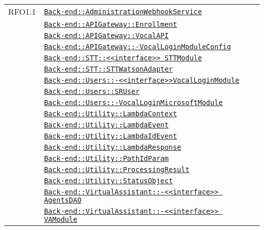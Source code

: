 \begin{longtable}{|>{\centering}m{3cm}|m{10cm}<{\centering}|}
RFO1.1 & \hyperref[Back-end::AdministrationWebhookService]{\texttt{Back-end::AdministrationWebhookService}}\\
& \hyperref[Back-end::APIGateway::Enrollment]{\texttt{Back-end::APIGateway::Enrollment}}\\
& \hyperref[Back-end::APIGateway::VocalAPI]{\texttt{Back-end::APIGateway::VocalAPI}}\\
& \hyperref[Back-end::APIGateway::VocalLoginModuleConfig]{\texttt{Back-end::APIGateway::-\linebreak VocalLoginModuleConfig}}\\
& \hyperref[Back-end::STT::<<interface>> STTModule]{\texttt{Back-end::STT::<<interface>> STTModule}}\\
& \hyperref[Back-end::STT::STTWatsonAdapter]{\texttt{Back-end::STT::STTWatsonAdapter}}\\
& \hyperref[Back-end::Users::<<interface>>VocalLoginModule]{\texttt{Back-end::Users::-\linebreak <<interface>>VocalLoginModule}}\\
& \hyperref[Back-end::Users::SRUser]{\texttt{Back-end::Users::SRUser}}\\
& \hyperref[Back-end::Users::VocalLoginMicrosoftModule]{\texttt{Back-end::Users::-\linebreak VocalLoginMicrosoftModule}}\\
& \hyperref[Back-end::Utility::LambdaContext]{\texttt{Back-end::Utility::LambdaContext}}\\
& \hyperref[Back-end::Utility::LambdaEvent]{\texttt{Back-end::Utility::LambdaEvent}}\\
& \hyperref[Back-end::Utility::LambdaIdEvent]{\texttt{Back-end::Utility::LambdaIdEvent}}\\
& \hyperref[Back-end::Utility::LambdaResponse]{\texttt{Back-end::Utility::LambdaResponse}}\\
& \hyperref[Back-end::Utility::PathIdParam]{\texttt{Back-end::Utility::PathIdParam}}\\
& \hyperref[Back-end::Utility::ProcessingResult]{\texttt{Back-end::Utility::ProcessingResult}}\\
& \hyperref[Back-end::Utility::StatusObject]{\texttt{Back-end::Utility::StatusObject}}\\
& \hyperref[Back-end::VirtualAssistant::<<interface>> AgentsDAO]{\texttt{Back-end::VirtualAssistant::-\linebreak <<interface>> AgentsDAO}}\\
& \hyperref[Back-end::VirtualAssistant::<<interface>> VAModule]{\texttt{Back-end::VirtualAssistant::-\linebreak <<interface>> VAModule}}\\

\end{longtable}
